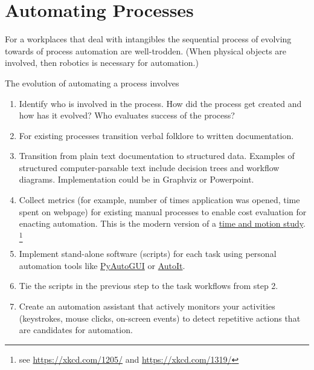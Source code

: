 \section{Automating Processes\label{sec:automating-processes}}



For a workplaces that deal with intangibles the sequential process of evolving towards of process automation are well-trodden.  (When physical objects are involved, then robotics is necessary for automation.)

The evolution of automating a process involves
\begin{enumerate}
    \item Identify who is involved in the process. How did the process get created and how has it evolved? Who evaluates success of the process? 
    \item For existing processes transition verbal folklore to written documentation.
    \item Transition from plain text documentation to structured data. Examples of structured computer-parsable text include  decision trees and workflow diagrams. Implementation could be in Graphviz or Powerpoint.
    \item Collect metrics (for example, number of times application was opened, time spent on webpage) for existing manual processes to enable cost evaluation for enacting automation. This is the modern version of a \href{https://en.wikipedia.org/wiki/Time_and_motion_study}{time and motion study}.
    \footnote{see \href{https://xkcd.com/1205/}{https://xkcd.com/1205/} and \href{https://xkcd.com/1319/}{https://xkcd.com/1319/}}
    \item Implement stand-alone software (scripts) for each task using personal automation tools like \href{https://pyautogui.readthedocs.io/en/latest/}{PyAutoGUI} or \href{https://www.autoitscript.com/site/}{AutoIt}.
    \item Tie the scripts in the previous step to the task workflows from step 2.
    \item Create an automation assistant that actively monitors your activities (keystrokes, mouse clicks, on-screen events) to detect repetitive actions that are candidates for automation.
\end{enumerate}


